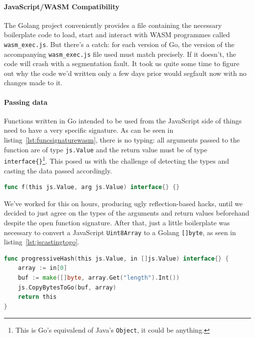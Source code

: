 \paragraph{JavaScript/WASM Compatibility} The Golang project conveniently provides a file containing the necessary boilerplate code to load, start and interact with \gls{WASM} programmes called \texttt{wasm\_exec.js}.
But there's a catch: for each version of Go, the version of the accompanying \texttt{wasm\_exec.js} file used must match precisely.
If it doesn't, the code will crash with a segmentation fault.
It took us quite some time to figure out why the code we'd written only a few days prior would segfault now with no changes made to it.

\paragraph{Passing data} Functions written in Go intended to be used from the JavaScript side of things need to have a very specific signature.
As can be seen in listing~\ref{lst:funcsignaturewasm}, there is no typing: all arguments passed to the function are of type \texttt{js.Value} and the return value must be of type \texttt{interface\{\}}\footnote{This is Go's equivalend of Java's \texttt{Object}, it could be anything.}.
This posed us with the challenge of detecting the types and casting the data passed accordingly.

\begin{lstlisting}[caption={Golang WASM function signature}, captionpos=b, language=Go, label={lst:funcsignaturewasm}]
    func f(this js.Value, arg js.Value) interface{} {}
\end{lstlisting}

We've worked for this on hours, producing ugly reflection-based hacks, until we decided to just agree on the types of the arguments and return values beforehand despite the open function signature.
After that, just a little boilerplate was necessary to convert a JavaScript \texttt{Uint8Array} to a Golang \texttt{[]byte}, as seen in listing~\ref{lst:jscastingtogo}.

\begin{lstlisting}[caption={Uint8Array to {[]}byte}, captionpos=b, language=Go, label={lst:jscastingtogo}, captionpos=b]
func progressiveHash(this js.Value, in []js.Value) interface{} {
    array := in[0]
    buf := make([]byte, array.Get("length").Int())
    js.CopyBytesToGo(buf, array)
    return this
}
\end{lstlisting}

